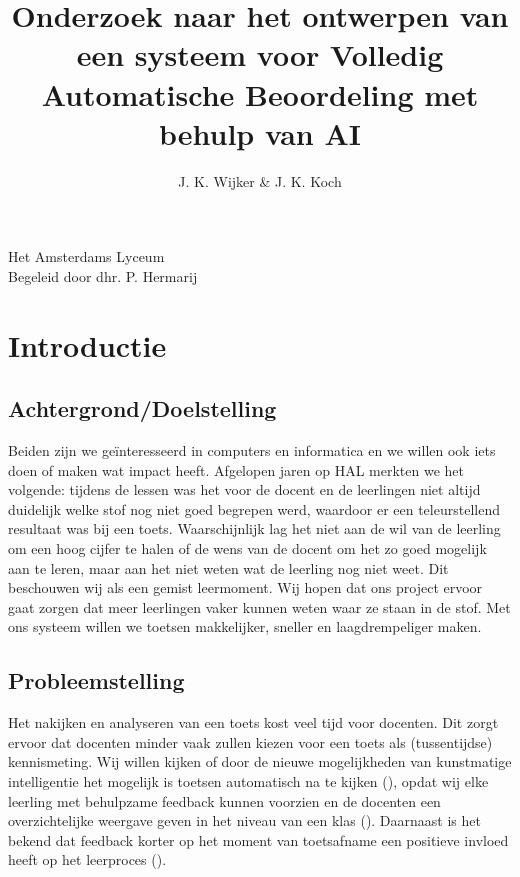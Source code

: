 \documentclass[12pt]{article}
\title{Onderzoek naar het ontwerpen van een systeem voor Volledig Automatische Beoordeling met behulp van AI}
\author{J. K. Wijker \& J. K. Koch}
\begin{document}
\maketitle
\mbox{}
\vfill
\begin{flushright}
\large Het Amsterdams Lyceum\\
\scriptsize Begeleid door dhr. P. Hermarij \normalsize
\end{flushright}
\thispagestyle{empty}
\pagebreak

{\scriptsize\tableofcontents \normalsize}

\pagebreak
\section{Introductie}
\begin{multicols}{2}
\subsection{Achtergrond/Doelstelling} 

Beiden zijn we geïnteresseerd in computers en informatica en we willen ook iets doen of maken wat impact heeft. Afgelopen jaren op HAL merkten we het volgende: tijdens de lessen was het voor de docent en de leerlingen niet altijd duidelijk welke stof nog niet goed begrepen werd, waardoor er een teleurstellend resultaat was bij een toets. Waarschijnlijk lag het niet aan de wil van de leerling om een hoog cijfer te halen of de wens van de docent om het zo goed mogelijk aan te leren, maar aan het niet weten wat de leerling nog niet weet. Dit beschouwen wij als een gemist leermoment. Wij hopen dat ons project ervoor gaat zorgen dat meer leerlingen vaker kunnen weten waar ze staan in de stof. Met ons systeem willen we toetsen makkelijker, sneller en laagdrempeliger maken.


\subsection{Probleemstelling}

Het nakijken en analyseren van een toets kost veel tijd voor docenten. Dit zorgt ervoor dat docenten minder vaak zullen kiezen voor een toets als (tussentijdse) kennismeting. Wij willen kijken of door de nieuwe mogelijkheden van kunstmatige intelligentie het mogelijk is toetsen automatisch na te kijken (\cite{mdpiAIinEducation}), opdat wij elke leerling met behulpzame feedback kunnen voorzien en de docenten een overzichtelijke weergave geven in het niveau van een klas (\cite{YEUNG2023EVA}). Daarnaast is het bekend dat feedback korter op het moment van toetsafname een positieve invloed heeft op het leerproces (\cite{powerFeedback}). 


\end{multicols}
\end{document}
